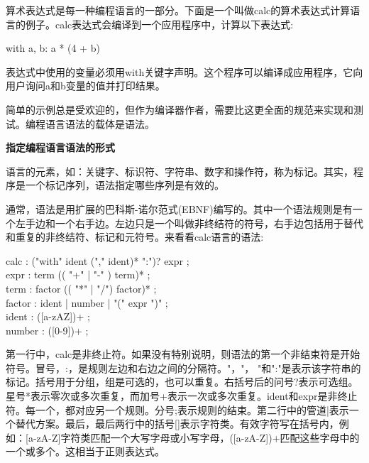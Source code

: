 算术表达式是每一种编程语言的一部分。下面是一个叫做calc的算术表达式计算语言的例子。calc表达式会编译到一个应用程序中，计算以下表达式:\par

\begin{tcolorbox}[colback=white,colframe=black]
with a, b: a * (4 + b)
\end{tcolorbox}

表达式中使用的变量必须用with关键字声明。这个程序可以编译成应用程序，它向用户询问a和b变量的值并打印结果。\par

简单的示例总是受欢迎的，但作为编译器作者，需要比这更全面的规范来实现和测试。编程语言语法的载体是语法。\par

\hspace*{\fill} \par %
\textbf{指定编程语言语法的形式}

语言的元素，如：关键字、标识符、字符串、数字和操作符，称为标记。其实，程序是一个标记序列，语法指定哪些序列是有效的。\par

通常，语法是用扩展的巴科斯-诺尔范式(EBNF)编写的。其中一个语法规则是有一个左手边和一个右手边。左边只是一个叫做非终结符的符号，右手边包括用于替代和重复的非终结符、标记和元符号。来看看calc语言的语法:\par

\begin{tcolorbox}[colback=white,colframe=black]
calc : ("with" ident ("," ident)* ":")? expr ; \\
expr : term (( "+" | "-" ) term)* ; \\
term : factor (( "*" | "/") factor)* ; \\
factor : ident | number | "(" expr ")" ; \\
ident : ([a-zAZ])+ ; \\
number : ([0-9])+ ; 
\end{tcolorbox}

第一行中，calc是非终止符。如果没有特别说明，则语法的第一个非结束符是开始符号。冒号，:，是规则左边和右边之间的分隔符。"，"， "和":"是表示该字符串的标记。括号用于分组，组是可选的，也可以重复。右括号后的问号?表示可选组。星号*表示零次或多次重复，而加号+表示一次或多次重复。ident和expr是非终止符。每一个，都对应另一个规则。分号;表示规则的结束。第二行中的管道|表示一个替代方案。最后，最后两行中的括号[]表示字符类。有效字符写在括号内，例如：[a-zA-Z]字符类匹配一个大写字母或小写字母，([a-zA-Z])+匹配这些字母中的一个或多个。这相当于正则表达式。\par

